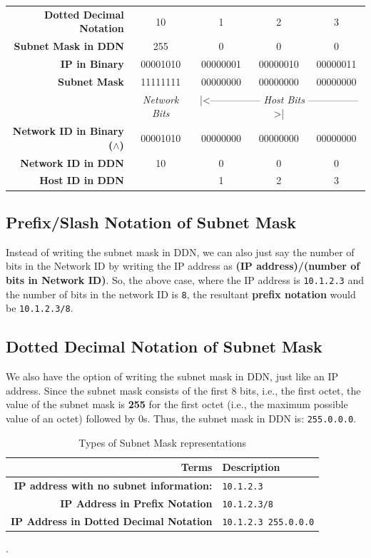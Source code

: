 \begin{center}
	\begin{tabular}{rcccc}
		\toprule
		\textbf{Dotted Decimal Notation} &10 &1 &2 &3 \\
		\textbf{Subnet Mask in DDN} &255 &0 &0 &0 \\
		\midrule
		\textbf{IP in Binary}	&00001010 &00000001 &00000010 &00000011\\
		\textbf{Subnet Mask} &11111111 &00000000 &00000000 &00000000\\
		\midrule
		&\textit{Network Bits} &\multicolumn{3}{c}{|<--------------- \textit{Host Bits} --------------->|} \\ 
		\textbf{Network ID in Binary ($\wedge$)} &00001010 &00000000 &00000000 &00000000 \\
		\midrule
		\textbf{Network ID in DDN} &10 &0 &0 &0 \\
		\textbf{Host ID in DDN} & &1 &2 &3 \\
		\bottomrule
	\end{tabular}
\end{center}

\subsection{Prefix/Slash Notation of Subnet Mask}
Instead of writing the subnet mask in DDN, we can also just say the number of bits in the Network ID by writing the IP address as \textbf{(IP address)/(number of bits in Network ID)}. So, the above case, where the IP address is \verb|10.1.2.3| and the number of bits in the network ID is \verb|8|, the resultant \textbf{prefix notation} would be \verb|10.1.2.3/8|. 

\subsection{Dotted Decimal Notation of Subnet Mask}
We also have the option of writing the subnet mask in DDN, just like an IP address. Since the subnet mask consists of the first 8 bits, i.e., the first octet, the value of the subnet mask is \textbf{255} for the first octet (i.e., the maximum possible value of an octet) followed by 0s. Thus, the subnet mask in DDN is: \verb|255.0.0.0|.

\noindent

\begin{table}[H]
	\centering
	\begin{tabular}{rl}
		\toprule
		\textbf{Terms} &\textbf{Description} \\
		\midrule
		\textbf{IP address with no subnet information:}	&\verb|10.1.2.3|\\
		\textbf{IP Address in Prefix Notation}	&\verb|10.1.2.3/8|\\
		\textbf{IP Address in Dotted Decimal Notation}	&\verb|10.1.2.3 255.0.0.0|\\
		\bottomrule
	\end{tabular}
	\vspace{-5pt}
	\caption{Types of Subnet Mask representations}.
\end{table}
\vspace{-10pt}

